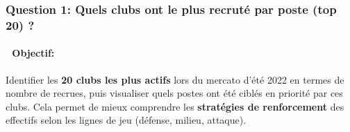 \documentclass[
]{article}
\begin{document}
\subsubsection{\texorpdfstring{\textbf{Question 1:} Quels clubs ont le
plus recruté par poste (top 20)
?}{Question 1: Quels clubs ont le plus recruté par poste (top 20) ?}}\label{question-1-quels-clubs-ont-le-plus-recrutuxe9-par-poste-top-20}

\paragraph{🎯 Objectif:}\label{objectif}

Identifier les \textbf{20 clubs les plus actifs} lors du mercato d'été
2022 en termes de nombre de recrues, puis visualiser quels postes ont
été ciblés en priorité par ces clubs. Cela permet de mieux comprendre
les \textbf{stratégies de renforcement} des effectifs selon les lignes
de jeu (défense, milieu, attaque).
\end{document}
